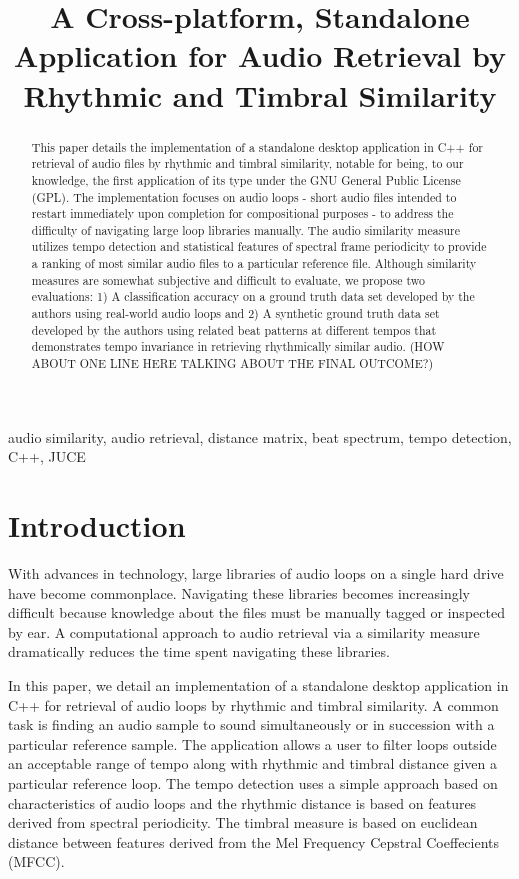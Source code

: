 \documentclass{article}
\title{A Cross-platform, Standalone Application for Audio Retrieval by Rhythmic and Timbral Similarity}
\begin{document}
%
\maketitle
%
\begin{abstract}
This paper details the implementation of a standalone desktop application in C++ for retrieval of audio files by rhythmic and timbral similarity, notable for being, to our knowledge, the first application of its type under the GNU General Public License (GPL). The implementation focuses on audio loops - short audio files intended to restart immediately upon completion for compositional purposes - to address the difficulty of navigating large loop libraries manually. The audio similarity measure utilizes tempo detection and statistical features of spectral frame periodicity to provide a ranking of most similar audio files to a particular reference file. Although similarity measures are somewhat subjective and difficult to evaluate, we propose two evaluations: 1) A classification accuracy on a ground truth data set developed by the authors using real-world audio loops and 2) A synthetic ground truth data set developed by the authors using related beat patterns at different tempos that demonstrates tempo invariance in retrieving rhythmically similar audio. (HOW ABOUT ONE LINE HERE TALKING ABOUT THE FINAL OUTCOME?)
\end{abstract}
%
\begin{keywords}
audio similarity, audio retrieval, distance matrix, beat spectrum, tempo detection, C++, JUCE
\end{keywords}
%
\section{Introduction}

With advances in technology, large libraries of audio loops on a single hard drive have become commonplace. Navigating these libraries becomes increasingly difficult because knowledge about the files must be manually tagged or inspected by ear. A computational approach to audio retrieval via a similarity measure dramatically reduces the time spent navigating these libraries.

In this paper, we detail an implementation of a standalone desktop application in C++ for retrieval of audio loops by rhythmic and timbral similarity. A common task is finding an audio sample to sound simultaneously or in succession with a particular reference sample. The application allows a user to filter loops outside an acceptable range of tempo along with rhythmic and timbral distance given a particular reference loop. The tempo detection uses a simple approach based on characteristics of audio loops and the rhythmic distance is based on features derived from spectral periodicity. The timbral measure is based on euclidean distance between features derived from the Mel Frequency Cepstral Coeffecients (MFCC).
\end{document}
